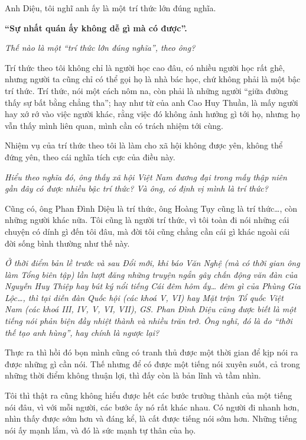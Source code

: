 Anh Diệu, tôi nghĩ anh ấy là một trí thức lớn đúng nghĩa.


{\bf “Sự nhất quán ấy không dễ gì mà có được”.}

\emph{Thế nào là một “trí thức lớn đúng nghĩa”, theo ông? }

Trí thức theo tôi không chỉ là người học cao đâu, có nhiều người học rất ghê, nhưng người ta cũng chỉ có thể gọi họ là nhà bác học, chứ không phải là một bậc trí thức. Trí thức, nói một cách nôm na, còn phải là những người “giữa đường thấy sự bất bằng chẳng tha”; hay như từ của anh Cao Huy Thuần, là mấy người hay xớ rớ vào việc người khác, rằng việc đó không ảnh hưởng gì tới họ, nhưng họ vẫn thấy mình liên quan, mình cần có trách nhiệm tới cùng.

Nhiệm vụ của trí thức theo tôi là làm cho xã hội không được yên, không thể đứng yên, theo cái nghĩa tích cực của điều này.

\emph{Hiểu theo nghĩa đó, ông thấy xã hội Việt Nam đương đại trong mấy thập niên gần đây có được nhiều bậc trí thức? Và ông, có định vị mình là trí thức?}

Cũng có, ông Phan Đình Diệu là trí thức, ông Hoàng Tụy cũng là trí thức…, còn những người khác nữa. Tôi cũng là người trí thức, vì tôi toàn đi nói những cái chuyện có dính gì đến tôi đâu, mà đời tôi cũng chẳng cần cái gì khác ngoài cái đời sống bình thường như thế này.

\emph{Ở thời điểm bản lề trước và sau Đổi mới, khi báo Văn Nghệ (mà có thời gian ông làm Tổng biên tập) lần lượt đăng những truyện ngắn gây chấn động văn đàn của Nguyễn Huy Thiệp hay bút ký nổi tiếng Cái đêm hôm ấy… đêm gì của Phùng Gia Lộc…, thì tại diễn đàn Quốc hội (các khoá V, VI) hay Mặt trận Tổ quốc Việt Nam (các khoá III, IV, V, VI, VII), GS. Phan Đình Diệu cũng được biết là một tiếng nói phản biện đầy nhiệt thành và nhiều trăn trở. Ông nghĩ, đó là do “thời thế tạo anh hùng”, hay chính là ngược lại?}

Thực ra thì hồi đó bọn mình cũng có tranh thủ được một thời gian để kịp nói ra được những gì cần nói. Thế nhưng để có được một tiếng nói xuyên suốt, cả trong những thời điểm không thuận lợi, thì đấy còn là bản lĩnh và tầm nhìn.

Tôi thì thật ra cũng không hiểu được hết các bước trưởng thành của một tiếng nói đâu, vì với mỗi người, các bước ấy nó rất khác nhau. Có người đi nhanh hơn, nhìn thấy được sớm hơn và đáng kể, là cất được tiếng nói sớm hơn. Những tiếng nói ấy mạnh lắm, và đó là sức mạnh tự thân của họ.

